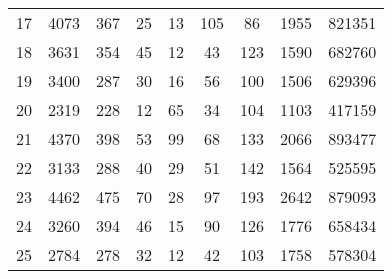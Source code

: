 \begin{table*}[!hbt]
\begin{center}
\begin{tabular}{l| c c c c c c c c}
                  17          &                       4073 &                         367 &                    25 &                             13 &                        105 &                            86 &                     1955 &   821351 \\
                  18          &                       3631 &                         354 &                    45 &                             12 &                         43 &                           123 &                     1590 &   682760 \\
                  19          &                       3400 &                         287 &                    30 &                             16 &                         56 &                           100 &                     1506 &   629396 \\
                  20          &                       2319 &                         228 &                    12 &                             65 &                         34 &                           104 &                     1103 &   417159 \\
                  21          &                       4370 &                         398 &                    53 &                             99 &                         68 &                           133 &                     2066 &   893477 \\
                  22          &                       3133 &                         288 &                    40 &                             29 &                         51 &                           142 &                     1564 &   525595 \\
                  23          &                       4462 &                         475 &                    70 &                             28 &                         97 &                           193 &                     2642 &   879093 \\
                  24          &                       3260 &                         394 &                    46 &                             15 &                         90 &                           126 &                     1776 &   658434 \\
                  25          &                       2784 &                         278 &                    32 &                             12 &                         42 &                           103 &                     1758 &   578304 \\ \bottomrule
            \end{tabular}
      \end{center}
\end{table*}

